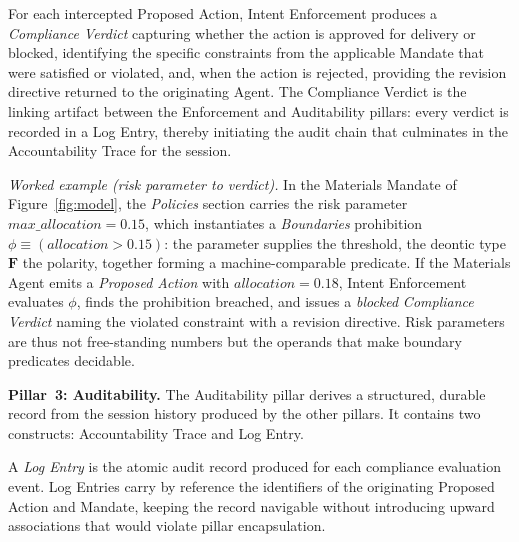 \documentclass[runningheads]{llncs}
\begin{document}
For each intercepted Proposed Action, Intent Enforcement produces a
\textit{Compliance Verdict} capturing whether the action is approved for
delivery or blocked, identifying the specific constraints from the
applicable Mandate that were satisfied or violated, and, when the action
is rejected, providing the revision directive returned to the originating
Agent. The Compliance Verdict is the linking artifact between the
Enforcement and Auditability pillars: every verdict is recorded in a Log
Entry, thereby initiating the audit chain that culminates in the
Accountability Trace for the session.

\textit{Worked example (risk parameter to verdict).} In the Materials
Mandate of Figure~\ref{fig:model}, the \textit{Policies} section carries
the risk parameter $\mathit{max\_allocation}=0.15$, which instantiates a
\textit{Boundaries} prohibition $\phi \equiv (\mathit{allocation} >
0.15)$: the parameter supplies the threshold, the deontic type
$\mathbf{F}$ the polarity, together forming a machine-comparable
predicate. If the Materials Agent emits a \textit{Proposed Action} with
$\mathit{allocation}=0.18$, Intent Enforcement evaluates $\phi$, finds
the prohibition breached, and issues a \emph{blocked} \textit{Compliance
Verdict} naming the violated constraint with a revision directive. Risk
parameters are thus not free-standing numbers but the operands that make
boundary predicates decidable.

\textbf{Pillar~3: Auditability.}
The Auditability pillar derives a structured, durable record from the
session history produced by the other pillars. It contains two
constructs: Accountability Trace and Log Entry.

A \textit{Log Entry} is the atomic audit record produced for each
compliance evaluation event. Log Entries carry by reference the
identifiers of the originating Proposed Action and Mandate, keeping the
record navigable without introducing upward associations that would
violate pillar encapsulation.
\end{document}
